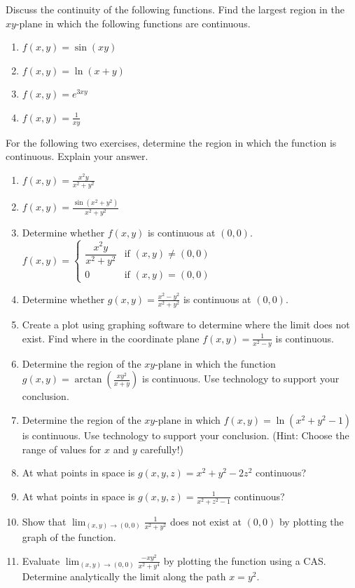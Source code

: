 \documentclass{exercises}
\begin{document}
Discuss the continuity of the following functions. Find the largest region in the $xy\text{-plane}$ in which the following functions are continuous.

\begin{enumerate}[resume]
\item $f(x,y)=\sin(xy)$
\item $f(x,y)=\ln(x+y)$
\item $f(x,y)=e^{3xy}$
\item $f(x,y)=\frac{1}{xy}$
\end{enumerate}

For the following two exercises, determine the region in which the function is continuous. Explain your answer.

\begin{enumerate}[resume]
\item $f(x,y)=\frac{x^{2}y}{x^{2}+y^{2}}$
\item $f(x,y)=\frac{\sin(x^{2}+y^{2})}{x^{2}+y^{2}}$
\item Determine whether $f\left( x,y \right)$ is continuous at $\left( 0,0 \right)$. $f(x,y)=\begin{cases}\dfrac{x^{2}y}{x^{2}+y^{2}} & \text{if }(x,y)\ne(0,0) \\ 0 & \text{if }(x,y)=(0,0)\end{cases}$
\item Determine whether $g(x,y)=\frac{x^{2}-y^{2}}{x^{2}+y^{2}}$ is continuous at $(0,0)$.
\item Create a plot using graphing software to determine where the limit does not exist. Find where in the coordinate plane $f(x,y)=\frac{1}{x^{2}-y}$ is continuous.
\item Determine the region of the $xy\text{-plane}$ in which the function $g(x,y)=\arctan(\frac{xy^{2}}{x+y})$ is continuous. Use technology to support your conclusion.
\item Determine the region of the $xy\text{-plane}$ in which $f(x,y)=\ln(x^{2}+y^{2}-1)$ is continuous. Use technology to support your conclusion. (Hint: Choose the range of values for $x$ and $y$ carefully!)
\item At what points in space is $g(x,y,z)=x^{2}+y^{2}-2z^{2}$ continuous?
\item At what points in space is $g(x,y,z)=\frac{1}{x^{2}+z^{2}-1}$ continuous?
\item Show that $\lim_{(x,y)\to(0,0)}\frac{1}{x^{2}+y^{2}}$ does not exist at $(0,0)$ by plotting the graph of the function.
\item \techrequired Evaluate $\lim_{(x,y)\to(0,0)}\frac{-xy^{2}}{x^{2}+y^{4}}$ by plotting the function using a CAS. Determine analytically the limit along the path $x=y^{2}$.

\end{enumerate}
\end{document}
